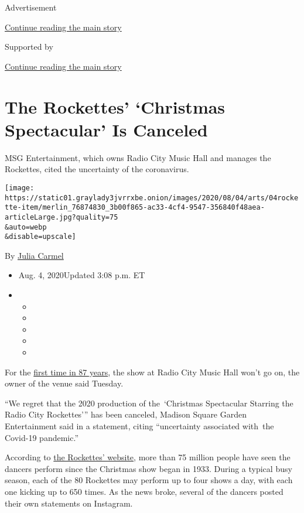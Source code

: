 Advertisement

\protect\hyperlink{after-top}{Continue reading the main story}

Supported by

\protect\hyperlink{after-sponsor}{Continue reading the main story}

\hypertarget{the-rockettes-christmas-spectacular-is-canceled}{%
\section{The Rockettes' `Christmas Spectacular' Is
Canceled}\label{the-rockettes-christmas-spectacular-is-canceled}}

MSG Entertainment, which owns Radio City Music Hall and manages the
Rockettes, cited the uncertainty of the coronavirus.

\texttt{[image: https://static01.graylady3jvrrxbe.onion/images/2020/08/04/arts/04rockette-item/merlin\_76874830\_3b00f865-ac33-4cf4-9547-356840f48aea-articleLarge.jpg?quality=75\\\&auto=webp\\\&disable=upscale]}

By \href{https://www.nytimes3xbfgragh.onion/by/julia-carmel}{Julia
Carmel}

\begin{itemize}
\item
  Aug. 4, 2020Updated 3:08 p.m. ET
\item
  \begin{itemize}
  \item
  \item
  \item
  \item
  \item
  \end{itemize}
\end{itemize}

For the
\href{https://www.rockettes.com/blog/fun-facts-about-the-radio-city-christmas-spectacular-and-the-rockettes/}{first
time in 87 years}, the show at Radio City Music Hall won't go on, the
owner of the venue said Tuesday.

``We regret that the 2020 production of the~`Christmas Spectacular
Starring the Radio City Rockettes''' has been canceled, Madison Square
Garden Entertainment said in a statement, citing ``uncertainty
associated with~the Covid-19 pandemic.''

According to \href{https://www.rockettes.com/blog/}{the Rockettes'
website}, more than 75 million people have seen the dancers perform
since the Christmas show began in 1933. During a typical busy season,
each of the 80 Rockettes may perform up to four shows a day, with each
one kicking up to 650 times. As the news broke, several of the dancers
posted their own statements on Instagram.

